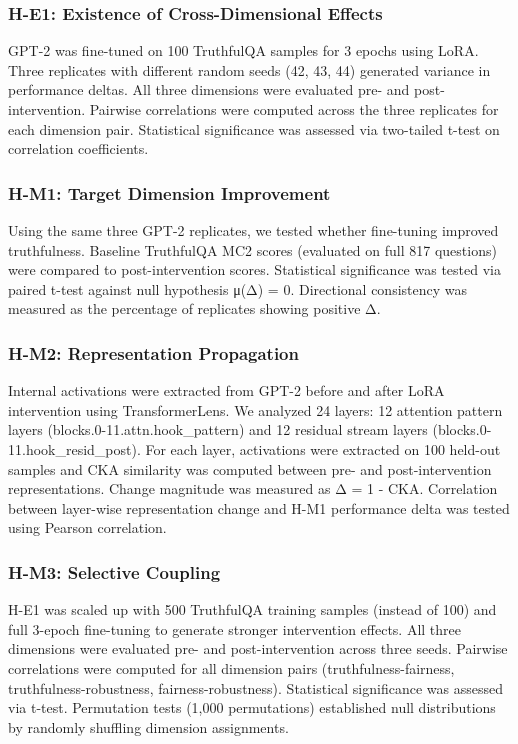 
\subsubsection{H-E1: Existence of Cross-Dimensional Effects}

GPT-2 was fine-tuned on 100 TruthfulQA samples for 3 epochs using LoRA. Three replicates with different random seeds (42, 43, 44) generated variance in performance deltas. All three dimensions were evaluated pre- and post-intervention. Pairwise correlations were computed across the three replicates for each dimension pair. Statistical significance was assessed via two-tailed t-test on correlation coefficients.

\subsubsection{H-M1: Target Dimension Improvement}

Using the same three GPT-2 replicates, we tested whether fine-tuning improved truthfulness. Baseline TruthfulQA MC2 scores (evaluated on full 817 questions) were compared to post-intervention scores. Statistical significance was tested via paired t-test against null hypothesis μ(Δ) = 0. Directional consistency was measured as the percentage of replicates showing positive Δ.

\subsubsection{H-M2: Representation Propagation}

Internal activations were extracted from GPT-2 before and after LoRA intervention using TransformerLens. We analyzed 24 layers: 12 attention pattern layers (blocks.{0-11}.attn.hook_pattern) and 12 residual stream layers (blocks.{0-11}.hook_resid_post). For each layer, activations were extracted on 100 held-out samples and CKA similarity was computed between pre- and post-intervention representations. Change magnitude was measured as Δ = 1 - CKA. Correlation between layer-wise representation change and H-M1 performance delta was tested using Pearson correlation.

\subsubsection{H-M3: Selective Coupling}

H-E1 was scaled up with 500 TruthfulQA training samples (instead of 100) and full 3-epoch fine-tuning to generate stronger intervention effects. All three dimensions were evaluated pre- and post-intervention across three seeds. Pairwise correlations were computed for all dimension pairs (truthfulness-fairness, truthfulness-robustness, fairness-robustness). Statistical significance was assessed via t-test. Permutation tests (1,000 permutations) established null distributions by randomly shuffling dimension assignments.

